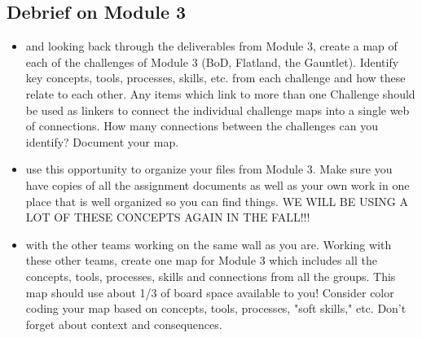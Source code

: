 \documentclass{tufte-handout}
\begin{document}
\subsection{Debrief on Module 3}
\begin{itemize}
\item {} and looking back through the deliverables from Module 3, create a map of each of the challenges of Module 3 (BoD, Flatland, the Gauntlet).  Identify key concepts, tools, processes, skills, etc. from each challenge and how these relate to each other.  Any items which link to more than one Challenge should be used as linkers to connect the individual challenge maps into a single web of connections.  How many connections between the challenges can you identify?  Document your map.
\item {} use this opportunity to organize your files from Module 3.  Make sure you have copies of all the assignment documents as well as your own work in one place that is well organized so you can find things.  WE WILL BE USING A LOT OF THESE CONCEPTS AGAIN IN THE FALL!!!
\item  {} with the other teams working on the same wall as you are.  Working with these other teams, create one map for Module 3 which includes all the concepts, tools, processes, skills and connections from all the groups.  This map should use about 1/3 of board space available to you!  Consider color coding your map based on concepts, tools, processes, "soft skills," etc. Don't forget about context and consequences.
\end{itemize}
\end{document}
